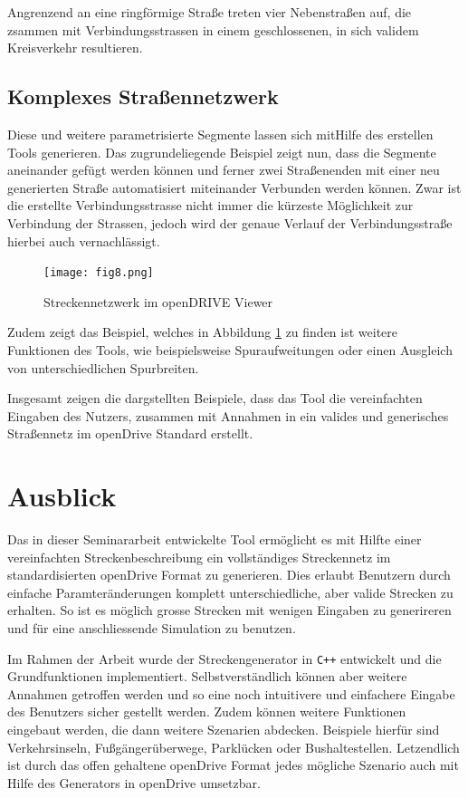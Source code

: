 Angrenzend an eine ringförmige Straße treten vier Nebenstraßen auf, die zsammen  mit Verbindungsstrassen in einem geschlossenen, in sich validem Kreisverkehr resultieren.   

\section{Komplexes Straßennetzwerk}

Diese und weitere parametrisierte Segmente lassen sich mitHilfe des erstellen Tools generieren. Das zugrundeliegende Beispiel zeigt nun, dass die Segmente aneinander gefügt werden können und ferner zwei Straßenenden mit einer neu generierten Straße automatisiert miteinander Verbunden werden können. Zwar ist die erstellte Verbindungsstrasse nicht immer die kürzeste Möglichkeit zur Verbindung der Strassen, jedoch wird der genaue Verlauf der Verbindungsstraße hierbei auch vernachlässigt.

\begin{figure}[H]
	\flushleft
	\texttt{[image: fig8.png]}
	\caption{Streckennetzwerk im openDRIVE Viewer}
	\label{abb7}
\end{figure}

Zudem zeigt das Beispiel, welches in Abbildung  \ref{abb7} zu finden ist weitere Funktionen des Tools, wie beispielsweise Spuraufweitungen oder einen Ausgleich von unterschiedlichen Spurbreiten.

Insgesamt zeigen die dargstellten Beispiele, dass das Tool die vereinfachten Eingaben des Nutzers, zusammen mit Annahmen in ein valides und generisches Straßennetz im openDrive Standard erstellt.

\chapter{Ausblick}

Das in dieser Seminararbeit entwickelte Tool ermöglicht es mit Hilfte einer vereinfachten Streckenbeschreibung ein vollständiges Streckennetz im standardisierten openDrive Format zu generieren. Dies erlaubt Benutzern durch einfache Paramteränderungen komplett unterschiedliche, aber valide Strecken zu erhalten. So ist es möglich grosse Strecken mit wenigen Eingaben zu generireren und für eine anschliessende Simulation zu benutzen.

Im Rahmen der Arbeit wurde der Streckengenerator in \texttt{C++} entwickelt und die Grundfunktionen implementiert. Selbstverständlich können aber weitere Annahmen getroffen werden und so eine noch intuitivere und einfachere Eingabe des Benutzers sicher gestellt werden. Zudem können weitere Funktionen eingebaut werden, die dann weitere Szenarien abdecken. Beispiele hierfür sind Verkehrsinseln, Fußgängerüberwege, Parklücken oder Bushaltestellen. Letzendlich ist durch das offen gehaltene openDrive Format jedes mögliche Szenario auch mit Hilfe des Generators in openDrive umsetzbar.

